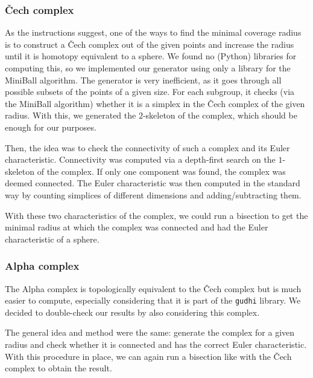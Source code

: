 \documentclass[twocolumn]{article}
\begin{document}
\subsubsection{Čech complex}
As the instructions suggest, one of the ways to find the minimal coverage radius is to construct a Čech complex out of the given points and increase the radius until it is homotopy equivalent to a sphere. We found no (Python) libraries for computing this, so we implemented our generator using only a library for the MiniBall algorithm. The generator is very inefficient, as it goes through all possible subsets of the points of a given size. For each subgroup, it checks (via the MiniBall algorithm) whether it is a simplex in the Čech complex of the given radius. With this, we generated the $2$-skeleton of the complex, which should be enough for our purposes. 

Then, the idea was to check the connectivity of such a complex and its Euler characteristic. Connectivity was computed via a depth-first search on the $1$-skeleton of the complex. If only one component was found, the complex was deemed connected. The Euler characteristic was then computed in the standard way by counting simplices of different dimensions and adding/subtracting them.

With these two characteristics of the complex, we could run a bisection to get the minimal radius at which the complex was connected and had the Euler characteristic of a sphere.

\subsubsection{Alpha complex}
The Alpha complex is topologically equivalent to the Čech complex but is much easier to compute, especially considering that it is part of the \texttt{gudhi} library. We decided to double-check our results by also considering this complex.

The general idea and method were the same: generate the complex for a given radius and check whether it is connected and has the correct Euler characteristic. With this procedure in place, we can again run a bisection like with the Čech complex to obtain the result.
\end{document}
